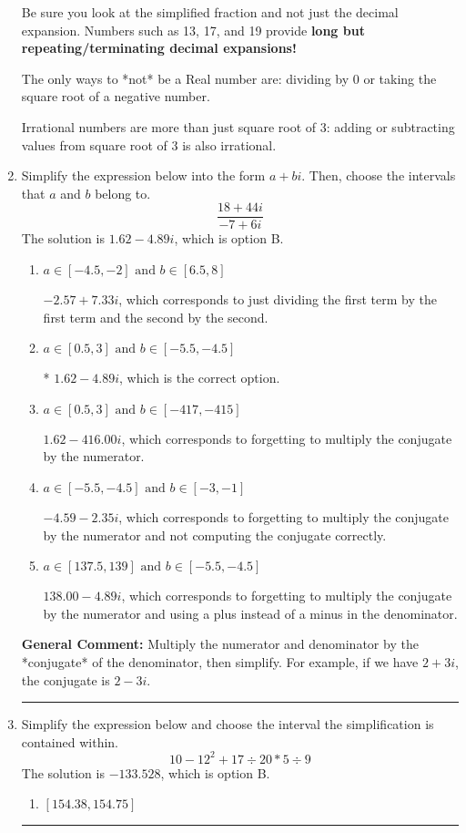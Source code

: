 \documentclass{extbook}[14pt]
\newcommand{\litem}[1]{\item #1

\rule{\textwidth}{0.4pt}}
\begin{document}
\begin{enumerate}
{ Be sure you look at the simplified fraction and not just the decimal expansion. Numbers such as 13, 17, and 19 provide \textbf{long but repeating/terminating decimal expansions!} 
 
 The only ways to *not* be a Real number are: dividing by 0 or taking the square root of a negative number. 
 
 Irrational numbers are more than just square root of 3: adding or subtracting values from square root of 3 is also irrational.
}
\litem{
Simplify the expression below into the form $a+bi$. Then, choose the intervals that $a$ and $b$ belong to.
\[ \frac{18 + 44 i}{-7 + 6 i} \]The solution is \( 1.62  - 4.89 i \), which is option B.\begin{enumerate}[label=\Alph*.]
\item \( a \in [-4.5, -2] \text{ and } b \in [6.5, 8] \)

 $-2.57  + 7.33 i$, which corresponds to just dividing the first term by the first term and the second by the second.
\item \( a \in [0.5, 3] \text{ and } b \in [-5.5, -4.5] \)

* $1.62  - 4.89 i$, which is the correct option.
\item \( a \in [0.5, 3] \text{ and } b \in [-417, -415] \)

 $1.62  - 416.00 i$, which corresponds to forgetting to multiply the conjugate by the numerator.
\item \( a \in [-5.5, -4.5] \text{ and } b \in [-3, -1] \)

 $-4.59  - 2.35 i$, which corresponds to forgetting to multiply the conjugate by the numerator and not computing the conjugate correctly.
\item \( a \in [137.5, 139] \text{ and } b \in [-5.5, -4.5] \)

 $138.00  - 4.89 i$, which corresponds to forgetting to multiply the conjugate by the numerator and using a plus instead of a minus in the denominator.
\end{enumerate}

\textbf{General Comment:} Multiply the numerator and denominator by the *conjugate* of the denominator, then simplify. For example, if we have $2+3i$, the conjugate is $2-3i$.
}
\litem{
Simplify the expression below and choose the interval the simplification is contained within.
\[ 10 - 12^2 + 17 \div 20 * 5 \div 9 \]The solution is \( -133.528 \), which is option B.\begin{enumerate}[label=\Alph*.]
\item \( [154.38, 154.75] \)


\end{enumerate}}
\end{enumerate}
\end{document}
